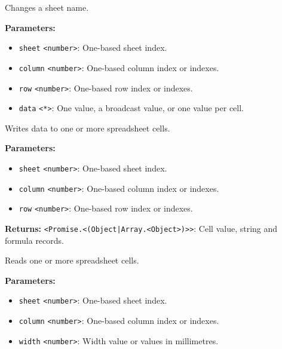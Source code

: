 \documentclass[12pt,a4paper]{article}
\begin{document}
\noindent Changes a sheet name.

\vspace{5mm}
\noindent {}


\noindent \textbf{Parameters:}
\begin{itemize}
  \item \texttt{sheet} \texttt{<number>}: One-based sheet index.
  \item \texttt{column} \texttt{<number>}: One-based column index or indexes.
  \item \texttt{row} \texttt{<number>}: One-based row index or indexes.
  \item \texttt{data} \texttt{<*>}: One value, a broadcast value, or one value per cell.
\end{itemize}

\noindent Writes data to one or more spreadsheet cells.

\vspace{5mm}
\noindent {}


\noindent \textbf{Parameters:}
\begin{itemize}
  \item \texttt{sheet} \texttt{<number>}: One-based sheet index.
  \item \texttt{column} \texttt{<number>}: One-based column index or indexes.
  \item \texttt{row} \texttt{<number>}: One-based row index or indexes.
\end{itemize}

\noindent \textbf{Returns:} \texttt{<Promise.<(Object|Array.<Object>)>>}: Cell value, string and formula records.

\noindent Reads one or more spreadsheet cells.

\vspace{5mm}
\noindent {}


\noindent \textbf{Parameters:}
\begin{itemize}
  \item \texttt{sheet} \texttt{<number>}: One-based sheet index.
  \item \texttt{column} \texttt{<number>}: One-based column index or indexes.
  \item \texttt{width} \texttt{<number>}: Width value or values in millimetres.
\end{itemize}
\end{document}

